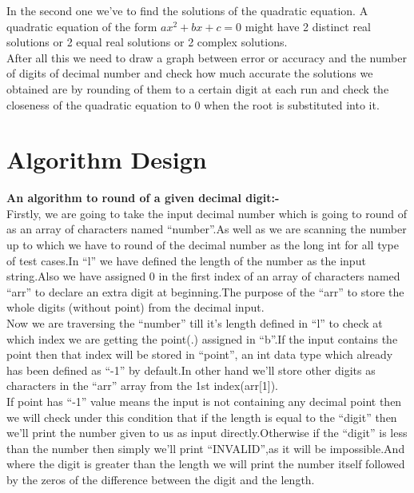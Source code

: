 \documentclass[conference]{IEEEtran}
\begin{document}
In the second one we've to find the solutions of the quadratic equation. A quadratic equation of the form $ax^2+bx+c=0$ might have 2 distinct real solutions or 2 equal real solutions or 2 complex solutions.\\%

After all this we need to draw a graph between error or accuracy and the number of digits of decimal number and check how much accurate the solutions we obtained are by rounding of them to a certain digit at each run and check the closeness of the quadratic equation to 0 when the root is substituted into it.\\

\section{Algorithm Design}
\textbf{An algorithm to round of a given decimal digit:-}\\

Firstly, we are going to take the input decimal number which is going to round of as an array of characters named “number”.As well as we are scanning the number up to which we have to round of the decimal number as the long int for all type of test cases.In “l” we have defined the length of the number as the input string.Also we have assigned 0 in the first index of an array of characters named “arr” to declare an extra digit at beginning.The purpose of the “arr” to store the whole digits (without point) from the decimal input.\\

Now we are traversing the “number” till it’s length defined in “l” to check at which index we are getting the point(.) assigned in “b”.If the input contains the point then that index will be stored in “point”, an int data type which already has been defined as “-1” by default.In other hand we’ll store other digits as characters in the “arr” array from the 1st index(arr[1]).\\

If point has “-1” value means the input is not containing any decimal point then we will check under this condition that if the length is equal to the “digit” then we’ll print the number given to us as input directly.Otherwise if the “digit” is less than the number then simply we’ll print “INVALID”,as it will be impossible.And where the digit is greater than the length we will print the number itself followed by the zeros of the difference between the digit and the length.\\
\end{document}
